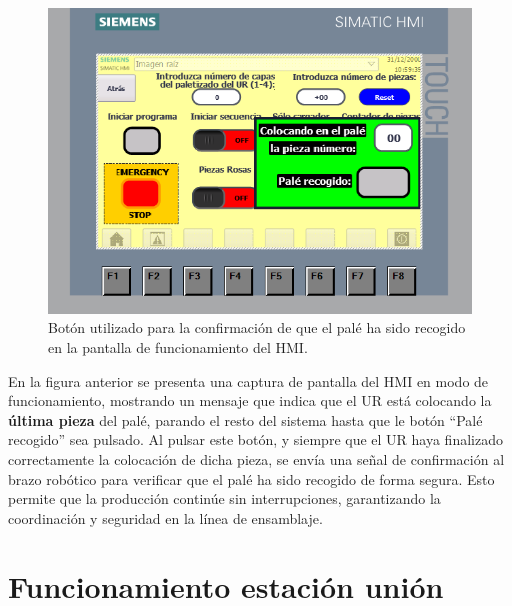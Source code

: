\begin{figure}[h!]
  \begin{center}
  	\includegraphics[width=15cm]{figs/HMI_funcionamiento_UR_recoger}
  \end{center}
  \caption{\centering Botón utilizado para la confirmación de que el palé ha sido recogido en la pantalla de funcionamiento del HMI.}
  \label{fig:HMI_funcionamiento_UR_recoger}
\end{figure}

En la figura anterior se presenta una captura de pantalla del HMI en modo de funcionamiento, mostrando un mensaje que indica que el UR está colocando la \textbf{última pieza} del palé, parando el resto del sistema hasta que le botón ``Palé recogido'' sea pulsado. Al pulsar este botón, y siempre que el UR haya finalizado correctamente la colocación de dicha pieza, se envía una señal de confirmación al brazo robótico para verificar que el palé ha sido recogido de forma segura. Esto permite que la producción continúe sin interrupciones, garantizando la coordinación y seguridad en la línea de ensamblaje.

\clearpage

\section{Funcionamiento estación unión}
\label{sec:funcionamiento_union}

